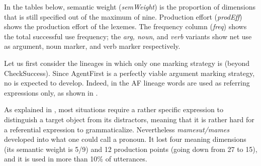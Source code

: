 \documentclass[output=paper]{LSP/langsci}
\begin{document}
In the tables below, semantic weight (\textit{semWeight}) is the proportion of dimensions that is still specified out of the maximum of nine. Production effort (\textit{prodEff}) shows the production effort of the lexemes. The frequency column (\textit{freq}) shows the total successful use frequency; the \textit{arg, noun}, and \textit{verb }variants show net use as argument, noun marker, and verb marker respectively. 

Let us first consider the lineages in which only one marking strategy is  (beyond CheckSuccess). Since AgentFirst is a perfectly viable argument marking strategy, no  is expected to develop. Indeed, in the AF lineage words are used as referring expressions only, as shown in . 

As explained in , most situations require a rather specific expression to distinguish a target object from its distractors, meaning that it is rather hard for a referential expression to grammaticalize. Nevertheless \textit{mamesut/mames} developed into what one could call a pronoun. It lost four meaning dimensions (its semantic weight is 5/9) and 12 production points (going down from 27 to 15), and it is used in more than 10\% of utterances. 

\begin{table}
\caption{Representations of three most frequent words of the AF lineage. First block: first generation; second block: representations after 56 generations.\label{17-le-tab:7-AF}}
\end{table}
\end{document}
